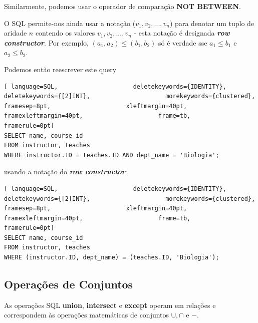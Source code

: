 \documentclass[titlepage]{book}
\theoremstyle{definition}
\begin{document}
Similarmente, podemos usar o operador de comparação \textbf{NOT BETWEEN}.

O SQL permite-nos ainda usar a notação ($v_{1}, v_{2}, ..., v_{n}$) para denotar um tuplo de aridade $n$ contendo os valores $v_1, v_2, ..., v_n$ - esta notação é designada \textbf{\textit{row constructor}}. Por exemplo, $(a_1, a_2) \leq (b_1, b_2)$ só é verdade sse $a_1 \leq b_1$ e $a_2 \leq b_2$.

Podemos então reescrever este query
\begin{lstlisting}[ language=SQL,                     deletekeywords={IDENTITY},                     deletekeywords={[2]INT},                     morekeywords={clustered},                     framesep=8pt,                     xleftmargin=40pt,                     framexleftmargin=40pt,                     frame=tb,                     framerule=0pt]
SELECT name, course_id
FROM instructor, teaches
WHERE instructor.ID = teaches.ID AND dept_name = 'Biologia';
\end{lstlisting}
usando a notação do \textbf{\textit{row constructor}}:
\begin{lstlisting}[ language=SQL,                     deletekeywords={IDENTITY},                     deletekeywords={[2]INT},                     morekeywords={clustered},                     framesep=8pt,                     xleftmargin=40pt,                     framexleftmargin=40pt,                     frame=tb,                     framerule=0pt]
SELECT name, course_id
FROM instructor, teaches
WHERE (instructor.ID, dept_name) = (teaches.ID, 'Biologia');
\end{lstlisting}

\subsection{Operações de Conjuntos}
As operações SQL \textbf{union}, \textbf{intersect} e \textbf{except} operam em relações e correspondem às operações matemáticas de conjuntos $\cup, \cap$ e $-$.
\end{document}
